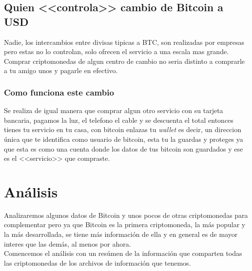 \documentclass[12pt,letterpaper]{article}
\begin{document}
	\subsection*{Quien <<controla>> cambio de Bitcoin a USD}
	Nadie, los intercambios entre divisas tipicas a BTC, son realizadas por empresas pero estas no lo controlan, solo ofrecen el servicio a una escala mas grande. Comprar criptomonedas de algun centro de cambio no seria distinto a comprarle a tu amigo unos y pagarle en efectivo.

		\subsubsection*{Como funciona este cambio}
        Se realiza de igual manera que comprar algun otro servicio con su tarjeta bancaria, pagamos la luz, el telefono el cable y se descuenta el total entonces tienes tu servicio en tu casa, con bitcoin enlazas tu \textit{wallet} es decir, un direccion \'unica que te identifica como usuario de bitcoin, esta tu la guardas y proteges ya que esta es como una cuenta donde los datos de tus bitcoin son guardados y ese es el <<servicio>> que compraste.












\section{An\'alisis}

    Analizaremos algunos datos de Bitcoin y unos pocos de otras criptomonedas para complementar pero ya que Bitcoin es la primera criptomoneda, la m\'as popular y la m\'as desarrollada, se tiene m\'as informaci\'on de ella y en general es de mayor interes que las dem\'as, al menos por ahora.
    \\
    Comencemos el an\'alisis con un res\'umen de la informaci\'on que comparten todas las criptomonedas de los archivos de informaci\'on que tenemos.
\end{document}
